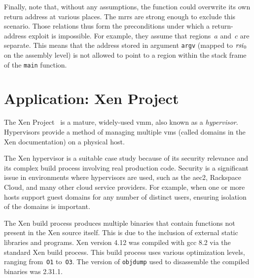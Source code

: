 Finally, note that, without any assumptions,
the function could overwrite its own return address at various places.
The \acp{mrr} are strong enough to exclude this scenario.
Those relations thus form the preconditions%
under which a return-address exploit is impossible.%
For example, they assume that regions~$a$ and~$c$ are separate.
This means that the address stored in argument \lstinline[language=C]|argv|
(mapped to $\mathit{rsi}_0$ on the assembly level)
is not allowed to point to a region
within the stack frame of the \lstinline[language=C]|main| function.

\section{Application: Xen Project}\label{se:xen}
The Xen Project~\citep{chisnall2008definitive}%
is a mature, widely-used \ac{vmm}, also known as a \emph{hypervisor}.%
Hypervisors provide a method of managing multiple
\acp{vm} (called domains in the Xen documentation) on a physical host.%

The Xen hypervisor is a suitable case study because of its security relevance%
and its complex build process involving real production code.
Security is a significant issue in environments where hypervisors are used,
such as the \ac{aec2}, Rackspace Cloud, and many other cloud service providers.
For example, when one or more hosts support guest domains
for any number of distinct users,
ensuring isolation of the domains is important.

The Xen build process produces multiple binaries
that contain functions not present in the Xen source itself.
This is due to the inclusion of external static libraries and programs.
Xen version 4.12 was compiled with \ac{gcc} 8.2 via the standard Xen build process.
This build process uses various optimization levels,
ranging from~\texttt{O1} to~\texttt{O3}.
The version of \texttt{objdump} used to disassemble the compiled binaries was 2.31.1.%
%

